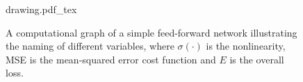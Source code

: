 \begin{figure}[bh!]
\centering
\newcommand{\repSigmoid}{$\sigma(\cdot)$}
\newcommand{\repLinear}{$\sum$}
\newcommand{\repMse}{MSE}
\newcommand{\repFirstSum}{$\Input j 1$}
\newcommand{\repLastSum}{$\Input i 0$}
\newcommand{\repFirstOutput}{\hspace{1.5cm}$\Con j i 0 \!=\! \Weight j i 0 \Out j 1$}
\newcommand{\repLastOutput}{$\Out i 0$}
\newcommand{\repLoss}{$E$}
\def\svgwidth{0.9\textwidth}
\hspace{-2cm}
{drawing.pdf_tex}
\hspace{-2cm}
\caption{A computational graph of a simple feed-forward network illustrating the naming of different variables, where $\sigma(\cdot)$ is the nonlinearity, MSE is the mean-squared error cost function and $E$ is the overall loss.}
\end{figure}